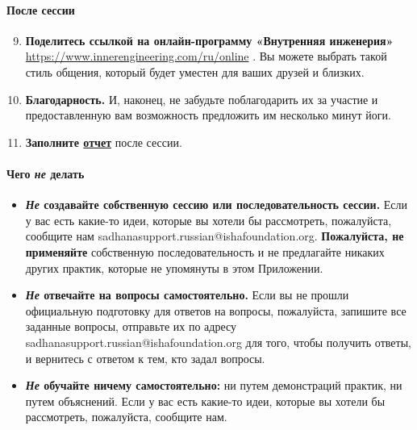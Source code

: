 \paragraph{После сессии}
\begin{enumerate}
    \setcounter{enumi}{8}
\item \textbf{Поделитесь ссылкой на онлайн-программу «Внутренняя инженерия»}
  \href{https://www.innerengineering.com/ru/online}{https://www.innerengineering.com/ru/online} \faSmileO. Вы можете выбрать такой стиль общения, который будет уместен для ваших друзей и близких.
    \item \textbf{Благодарность.} И, наконец, не забудьте поблагодарить их за участие и предоставленную вам возможность предложить им несколько минут йоги.
    \item \textbf{Заполните \href{https://forms.gle/q1N7jG4vBEWBmng86}{отчет}} после сессии. 
\end{enumerate}

\paragraph{Чего \emph{не} делать}
\begin{itemize}
    \item[\faRemove] \textbf{\emph{Не} создавайте собственную сессию или последовательность сессии.} Если у вас есть какие-то идеи, которые вы хотели бы рассмотреть, пожалуйста, сообщите нам sadhanasupport.russian@ishafoundation.org. \textbf{Пожалуйста, не применяйте} собственную последовательность и не предлагайте никаких других практик, которые не упомянуты в этом Приложении.
    \item[\faRemove] \textbf{\emph{Не} отвечайте на вопросы самостоятельно.} Если вы не прошли официальную подготовку для ответов на вопросы, пожалуйста, запишите все заданные вопросы, отправьте их по адресу sadhanasupport.russian@ishafoundation.org для того, чтобы получить ответы, и вернитесь с ответом к тем, кто задал вопросы.
    \item[\faRemove] \textbf{\emph{Не} обучайте ничему самостоятельно:} ни путем демонстраций практик, ни путем объяснений. Если у вас есть какие-то идеи, которые вы хотели бы
рассмотреть, пожалуйста, сообщите нам.
\end{itemize}

